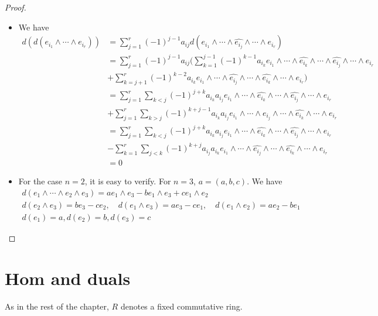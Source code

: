 \begin{proof}
\mbox{}
\begin{itemize}
\item We have
\begin{align*}
d(d(e_{i_1}\wedge\cdots\wedge e_{i_r}))&=\sum_{j=1}^{r}(−1)^{j-1}a_{ij}d(e_{i_1}\wedge\cdots\wedge\widehat{e_{i_j}}\wedge\cdots\wedge e_{i_r})\\
&=\sum_{j=1}^{r}(-1)^{j-1}a_{ij}\Big(\sum_{k=1}^{j-1}(-1)^{k-1}a_{i_k}e_{i_1}\wedge\cdots\wedge\widehat{e_{i_k}}\wedge\cdots\wedge\widehat{e_{i_j}}\wedge\cdots\wedge e_{i_r}\\
&+\sum_{k=j+1}^{r}(-1)^{k-2}a_{i_k}e_{i_1}\wedge\cdots\wedge\widehat{e_{i_j}}\wedge\cdots\wedge\widehat{e_{i_k}}\wedge\cdots\wedge e_{i_r}\Big)\\
&=\sum_{j=1}^{r}\sum_{k<j}(-1)^{j+k}a_{i_k}a_{i_j}e_{i_1}\wedge\cdots\wedge\widehat{e_{i_k}}\wedge\cdots\wedge\widehat{e_{i_j}}\wedge\cdots\wedge e_{i_r}\\
&+\sum_{j=1}^{r}\sum_{k>j}(-1)^{k+j-1}a_{i_k}a_{i_j}e_{i_1}\wedge\cdots\wedge\widehat{e_{i_j}}\wedge\cdots\wedge\widehat{e_{i_k}}\wedge\cdots\wedge e_{i_r}\\
&=\sum_{j=1}^{r}\sum_{k<j}(-1)^{j+k}a_{i_k}a_{i_j}e_{i_1}\wedge\cdots\wedge\widehat{e_{i_k}}\wedge\cdots\wedge\widehat{e_{i_j}}\wedge\cdots\wedge e_{i_r}\\
&-\sum_{k=1}^{r}\sum_{j<k}(-1)^{k+j}a_{i_j}a_{i_k}e_{i_1}\wedge\cdots\wedge\widehat{e_{i_j}}\wedge\cdots\wedge\widehat{e_{i_k}}\wedge\cdots\wedge e_{i_r}\\
&=0
\end{align*}
\item For the case $n=2$, it is easy to verify. For $n=3$, $a=(a,b,c)$. We have
\[\begin{array}{l}
d(e_1\wedge\cdots\wedge e_2\wedge e_3)=ae_1\wedge e_3-be_1\wedge e_3+ce_1\wedge e_2\\
d(e_2\wedge e_3)=be_3-ce_2,\quad d(e_1\wedge e_3)=ae_3-ce_1,\quad d(e_1\wedge e_2)=ae_2-be_1\\
d(e_1)=a,d(e_2)=b,d(e_3)=c
\end{array}\]
\end{itemize}
\end{proof}
\section{Hom and duals}
As in the rest of the chapter, $R$ denotes a fixed commutative ring.
